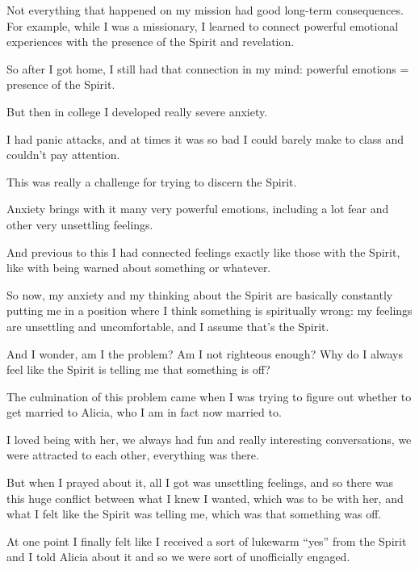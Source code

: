 \begin{compactitem}
			\item Not everything that happened on my mission had good long-term consequences. For example, while I was a missionary, I learned to connect powerful emotional experiences with the presence of the Spirit and revelation.
				\begin{compactitem}
					\item So after I got home, I still had that connection in my mind: powerful emotions = presence of the Spirit.
					\item But then in college I developed really severe anxiety. 
						\begin{compactitem}
							\item I had panic attacks, and at times it was so bad I could barely make to class and couldn't pay attention.
						\end{compactitem}
					\item This was really a challenge for trying to discern the Spirit.
						\begin{compactitem}
							\item Anxiety brings with it many very powerful emotions, including a lot fear and other very unsettling feelings.
							\item And previous to this I had connected feelings exactly like those with the Spirit, like with being warned about something or whatever.
							\item So now, my anxiety and my thinking about the Spirit are basically constantly putting me in a position where I think something is spiritually wrong: my feelings are unsettling and uncomfortable, and I assume that's the Spirit.
							\item And I wonder, am I the problem? Am I not righteous enough? Why do I always feel like the Spirit is telling me that something is off?
							\item The culmination of this problem came when I was trying to figure out whether to get married to Alicia, who I am in fact now married to.
							\item I loved being with her, we always had fun and really interesting conversations, we were attracted to each other, everything was there.
							\item But when I prayed about it, all I got was unsettling feelings, and so there was this huge conflict between what I knew I wanted, which was to be with her, and what I felt like the Spirit was telling me, which was that something was off. 
							\item At one point I finally felt like I received a sort of lukewarm ``yes'' from the Spirit and I told Alicia about it and so we were sort of unofficially engaged.

\end{compactitem}
\end{compactitem}
\end{compactitem}
